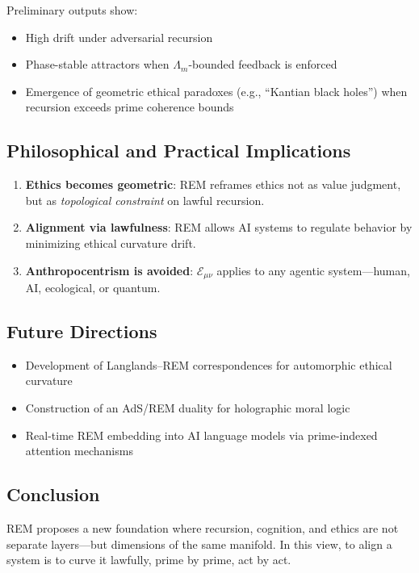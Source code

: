 \documentclass{article}
\theoremstyle{plain}
\begin{document}
Preliminary outputs show:
\begin{itemize}
  \item High drift under adversarial recursion
  \item Phase-stable attractors when $\Lambda_m$-bounded feedback is enforced
  \item Emergence of geometric ethical paradoxes (e.g., “Kantian black holes”) when recursion exceeds prime coherence bounds
\end{itemize}

\subsection{Philosophical and Practical Implications}

\begin{enumerate}
  \item \textbf{Ethics becomes geometric}: REM reframes ethics not as value judgment, but as \textit{topological constraint} on lawful recursion.
  \item \textbf{Alignment via lawfulness}: REM allows AI systems to regulate behavior by minimizing ethical curvature drift.
  \item \textbf{Anthropocentrism is avoided}: $\mathcal{E}_{\mu\nu}$ applies to any agentic system—human, AI, ecological, or quantum.
\end{enumerate}

\subsection{Future Directions}

\begin{itemize}
  \item Development of Langlands–REM correspondences for automorphic ethical curvature
  \item Construction of an AdS/REM duality for holographic moral logic
  \item Real-time REM embedding into AI language models via prime-indexed attention mechanisms
\end{itemize}

\subsection*{Conclusion}

REM proposes a new foundation where recursion, cognition, and ethics are not separate layers—but dimensions of the same manifold. In this view, to align a system is to curve it lawfully, prime by prime, act by act.


\nocite{*}


\end{document}
